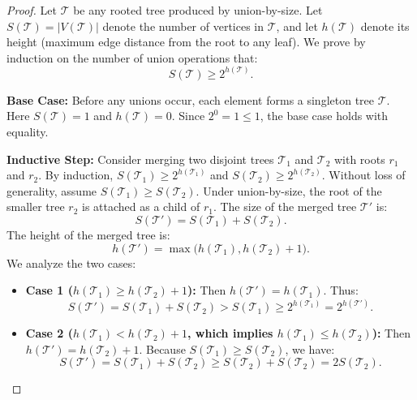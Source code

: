 \documentclass[11pt, letterpaper]{article}
\begin{document}
\begin{proof}
Let $\mathcal{T}$ be any rooted tree produced by union-by-size. Let $S(\mathcal{T}) = |V(\mathcal{T})|$ denote the number of vertices in $\mathcal{T}$, and let $h(\mathcal{T})$ denote its height (maximum edge distance from the root to any leaf).
We prove by induction on the number of union operations that:
\begin{equation}\label{eq:dsu_induct}
    S(\mathcal{T}) \ge 2^{h(\mathcal{T})}.
\end{equation}

\medskip\noindent\textbf{Base Case:} Before any unions occur, each element forms a singleton tree $\mathcal{T}$. Here $S(\mathcal{T}) = 1$ and $h(\mathcal{T}) = 0$. Since $2^0 = 1 \le 1$, the base case holds with equality.

\medskip\noindent\textbf{Inductive Step:} Consider merging two disjoint trees $\mathcal{T}_1$ and $\mathcal{T}_2$ with roots $r_1$ and $r_2$. By induction, $S(\mathcal{T}_1) \ge 2^{h(\mathcal{T}_1)}$ and $S(\mathcal{T}_2) \ge 2^{h(\mathcal{T}_2)}$.
Without loss of generality, assume $S(\mathcal{T}_1) \ge S(\mathcal{T}_2)$. 
Under union-by-size, the root of the smaller tree $r_2$ is attached as a child of $r_1$.
The size of the merged tree $\mathcal{T}'$ is:
\begin{equation}
    S(\mathcal{T}') = S(\mathcal{T}_1) + S(\mathcal{T}_2).
\end{equation}
The height of the merged tree is:
\begin{equation}
    h(\mathcal{T}') = \max\big(h(\mathcal{T}_1), h(\mathcal{T}_2) + 1\big).
\end{equation}
We analyze the two cases:
\begin{itemize}
    \item \textbf{Case 1 ($h(\mathcal{T}_1) \ge h(\mathcal{T}_2) + 1$):} Then $h(\mathcal{T}') = h(\mathcal{T}_1)$. Thus:
    \begin{equation}
        S(\mathcal{T}') = S(\mathcal{T}_1) + S(\mathcal{T}_2) > S(\mathcal{T}_1) \ge 2^{h(\mathcal{T}_1)} = 2^{h(\mathcal{T}')}.
    \end{equation}
    \item \textbf{Case 2 ($h(\mathcal{T}_1) < h(\mathcal{T}_2) + 1$, which implies $h(\mathcal{T}_1) \le h(\mathcal{T}_2)$):} Then $h(\mathcal{T}') = h(\mathcal{T}_2) + 1$. 
    Because $S(\mathcal{T}_1) \ge S(\mathcal{T}_2)$, we have:
    \begin{equation}
        S(\mathcal{T}') = S(\mathcal{T}_1) + S(\mathcal{T}_2) \ge S(\mathcal{T}_2) + S(\mathcal{T}_2) = 2 S(\mathcal{T}_2).

\end{equation}
\end{itemize}
\end{proof}
\end{document}
